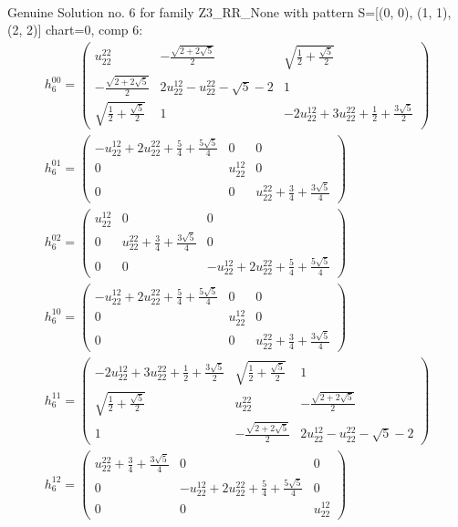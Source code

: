\documentclass[a4paper, 11pt, twoside, onecolumn]{article}
\begin{document}
\begin{landscape}
\begin{gather*}
\end{gather*} 
Genuine Solution no. 6 for family Z3_RR_None with pattern S=[(0, 0), (1, 1), (2, 2)] chart=0, comp 6: 
\begin{gather*} 
	 h_6^{00}=\begin{pmatrix}u^{22}_{22} & - \frac{\sqrt{2 + 2 \sqrt{5}}}{2} & \sqrt{\frac{1}{2} + \frac{\sqrt{5}}{2}}\\- \frac{\sqrt{2 + 2 \sqrt{5}}}{2} & 2 u^{12}_{22} - u^{22}_{22} - \sqrt{5} - 2 & 1\\\sqrt{\frac{1}{2} + \frac{\sqrt{5}}{2}} & 1 & - 2 u^{12}_{22} + 3 u^{22}_{22} + \frac{1}{2} + \frac{3 \sqrt{5}}{2}\end{pmatrix}\\ 
	 h_6^{01}=\begin{pmatrix}- u^{12}_{22} + 2 u^{22}_{22} + \frac{5}{4} + \frac{5 \sqrt{5}}{4} & 0 & 0\\0 & u^{12}_{22} & 0\\0 & 0 & u^{22}_{22} + \frac{3}{4} + \frac{3 \sqrt{5}}{4}\end{pmatrix}\\ 
	 h_6^{02}=\begin{pmatrix}u^{12}_{22} & 0 & 0\\0 & u^{22}_{22} + \frac{3}{4} + \frac{3 \sqrt{5}}{4} & 0\\0 & 0 & - u^{12}_{22} + 2 u^{22}_{22} + \frac{5}{4} + \frac{5 \sqrt{5}}{4}\end{pmatrix}\\ 
	 h_6^{10}=\begin{pmatrix}- u^{12}_{22} + 2 u^{22}_{22} + \frac{5}{4} + \frac{5 \sqrt{5}}{4} & 0 & 0\\0 & u^{12}_{22} & 0\\0 & 0 & u^{22}_{22} + \frac{3}{4} + \frac{3 \sqrt{5}}{4}\end{pmatrix}\\ 
	 h_6^{11}=\begin{pmatrix}- 2 u^{12}_{22} + 3 u^{22}_{22} + \frac{1}{2} + \frac{3 \sqrt{5}}{2} & \sqrt{\frac{1}{2} + \frac{\sqrt{5}}{2}} & 1\\\sqrt{\frac{1}{2} + \frac{\sqrt{5}}{2}} & u^{22}_{22} & - \frac{\sqrt{2 + 2 \sqrt{5}}}{2}\\1 & - \frac{\sqrt{2 + 2 \sqrt{5}}}{2} & 2 u^{12}_{22} - u^{22}_{22} - \sqrt{5} - 2\end{pmatrix}\\ 
	 h_6^{12}=\begin{pmatrix}u^{22}_{22} + \frac{3}{4} + \frac{3 \sqrt{5}}{4} & 0 & 0\\0 & - u^{12}_{22} + 2 u^{22}_{22} + \frac{5}{4} + \frac{5 \sqrt{5}}{4} & 0\\0 & 0 & u^{12}_{22}\end{pmatrix}\\ 

\end{gather*}
\end{landscape}
\end{document}
